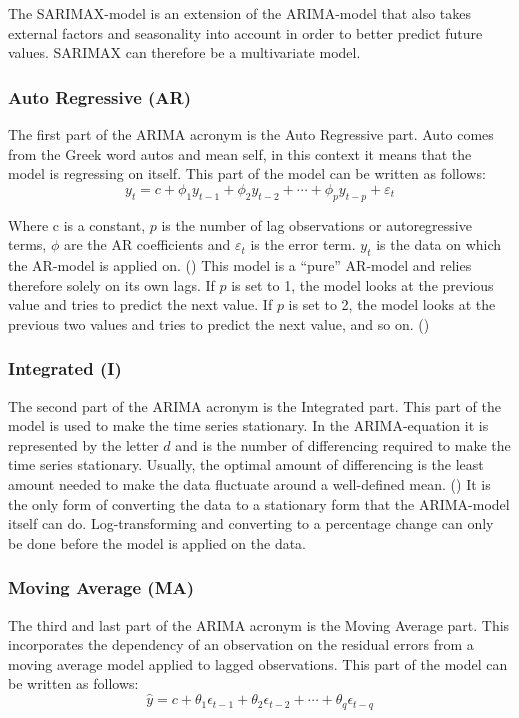 The SARIMAX-model is an extension of the ARIMA-model that also takes external factors and seasonality into account in order to better predict future values. SARIMAX can therefore be a multivariate model. \parencite{hyndman_athanasopoulos_2021}

\subsubsection{Auto Regressive (AR)}\label{AutoRegressiveTheory}
The first part of the ARIMA acronym is the Auto Regressive part. Auto comes from the Greek word autos and mean self, in this context it means that the model is regressing on itself. This part of the model can be written as follows:
\begin{equation}
y_{t} = c + \phi_{1}y_{t-1} + \phi_{2}y_{t-2} + \cdots + \phi_{p}y_{t-p} + \varepsilon_{t}
\end{equation}

Where c is a constant, $p$ is the number of lag observations or autoregressive terms, $\phi$ are the AR coefficients and $\varepsilon_{t}$ is the error term. $y_{t}$ is the data on which the AR-model is applied on. (\cite{oracle_ARIMA}) This model is a ``pure'' AR-model and relies therefore solely on its own lags. If $p$ is set to 1, the model looks at the previous value and tries to predict the next value. If $p$ is set to 2, the model looks at the previous two values and tries to predict the next value, and so on. (\cite{artley_2022})


\subsubsection{Integrated (I)}\label{IntegratedTheory}
The second part of the ARIMA acronym is the Integrated part. This part of the model is used to make the time series stationary. In the ARIMA-equation it is represented by the letter $d$ and is the number of differencing required to make the time series stationary. Usually, the optimal amount of differencing is the least amount needed to make the data fluctuate around a well-defined mean. (\cite{nau_2019}) It is the only form of converting the data to a stationary form that the ARIMA-model itself can do. Log-transforming and converting to a percentage change can only be done before the model is applied on the data. 

\subsubsection{Moving Average (MA)}\label{MovingAverageTheory}
The third and last part of the ARIMA acronym is the Moving Average part. This incorporates the dependency of an observation on the residual errors from a moving average model applied to lagged observations. \parencite{hayes_2019} This part of the model can be written as follows:
\begin{equation}
\hat{y} = c + \theta_1\epsilon_{t-1} + \theta_2\epsilon_{t-2} + \cdots + \theta_q\epsilon_{t-q}
\end{equation}

